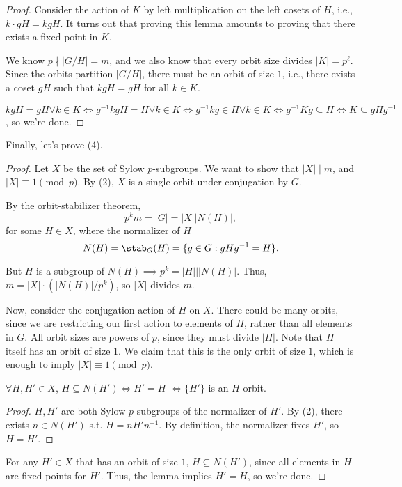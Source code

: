 \begin{proof}
Consider the action of $K$ by left multiplication on the left cosets of $H$, i.e., $k\cdot gH = kgH$. It turns out that proving this lemma amounts to proving that there exists a fixed point in $K$.

We know $p \nmid \vert G/H\vert = m$, and we also know that every orbit size divides $\vert K\vert = p^{\ell}$. Since the orbits partition $\vert G/H\vert$, there must be an orbit of size $1$, i.e., there exists a coset $gH$ such that $kgH = gH$ for all $k\in K$. 

$kgH = gH\forall k\in K \iff g^{-1}kgH = H\forall k\in K \iff g^{-1}kg\in H\forall k\in K \iff g^{-1}Kg\subseteq H \iff K\subseteq gHg^{-1}$, so we're done.
\end{proof}

Finally, let's prove (4). 

\begin{proof}
Let $X$ be the set of Sylow $p$-subgroups. We want to show that $\vert X\vert \mid m$, and $\vert X\vert \equiv 1\pmod{p}$. By (2), $X$ is a single orbit under conjugation by $G$. 

By the orbit-stabilizer theorem,
\[p^km = \vert G\vert = \vert X\vert \vert N(H)\vert,\]
for some $H\in X$, where the normalizer of $H$
\[N(H) = \stab_G(H) = \{g\in G : gHg^{-1} = H\}.\]

But $H$ is a subgroup of $N(H)\implies p^k = \vert H\vert \mid \vert N(H)\vert$. Thus, $m = \vert X\vert \cdot \left(\vert N(H)\vert / p^k\right)$, so $\vert X\vert$ divides $m$. 

Now, consider the conjugation action of $H$ on $X$. There could be many orbits, since we are restricting our first action to elements of $H$, rather than all elements in $G$. All orbit sizes are powers of $p$, since they must divide $\vert H\vert$. Note that $H$ itself has an orbit of size $1$. We claim that this is the only orbit of size $1$, which is enough to imply $\vert X\vert \equiv 1\pmod{p}$.

\begin{theorem}
\lemlabel

$\forall H, H'\in X$, $H\subseteq N(H')\iff H'=H$ $\iff\{H'\}$ is an $H$ orbit.  
\end{theorem}
\begin{proof}
$H, H'$ are both Sylow $p$-subgroups of the normalizer of $H'$. By (2), there exists $n\in N(H')$ s.t. $H = nH'n^{-1}$. By definition, the normalizer fixes $H'$, so $H = H'$. 
\end{proof}

For any $H'\in X$ that has an orbit of size $1$, $H\subseteq N(H')$, since all elements in $H$ are fixed points for $H'$. Thus, the lemma implies $H'=H$, so we're done.
\end{proof}

